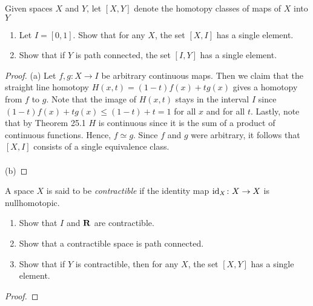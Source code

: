 \newpage
\begin{problem}[Munkres \S51, Ex.\,2]
Given spaces $X$ and $Y$, let $[X,Y]$ denote the homotopy classes
of maps of $X$ into $Y$
\begin{enumerate}[label=(\alph*)]
\item Let $I=[0,1]$. Show that for any $X$, the set $[X,I]$ has a
  single element.
\item Show that if $Y$ is path connected, the set $[I,Y]$ has a
  single element.
\end{enumerate}
\end{problem}
\begin{proof}
(a) Let $f,g\colon X\to I$ be arbitrary continuous maps. Then we
claim that the straight line homotopy $H(x,t)=(1-t)f(x)+tg(x)$
gives a homotopy from $f$ to $g$. Note that the image of $H(x,t)$
stays in the interval $I$ since $(1-t)f(x)+tg(x)\leq (1-t)+t=1$
for all $x$ and for all $t$. Lastly, note that by Theorem 25.1
$H$ is continuous since it is the sum of a product of continuous
functions. Hence, $f\simeq g$. Since $f$ and $g$ were arbitrary,
it follows that $[X,I]$ consists of a single equivalence class.
\\\\
(b)
\end{proof}
\newpage
\begin{problem}[Munkres \S51, Ex.\,3(a,b,c,)]
A space $X$ is said to be \emph{contractible} if the identity map
$\operatorname{id}_X\colon X\to X$ is nullhomotopic.
\begin{enumerate}[label=(\alph*)]
\item Show that $I$ and $\mathbf{R}$ are contractible.
\item Show that a contractible space is path connected.
\item Show that if $Y$ is contractible, then for any $X$, the set
  $[X,Y]$ has a single element.
\end{enumerate}
\end{problem}
\begin{proof}
\end{proof}

